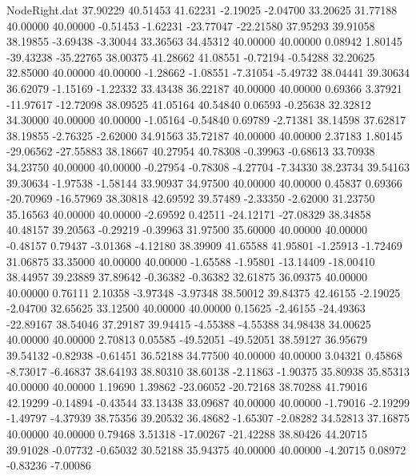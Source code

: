 \begin{filecontents}{NodeRight.dat}
  37.90229   40.51453   41.62231    -2.19025   -2.04700   33.20625   31.77188   40.00000   40.00000   -0.51453   -1.62231  -23.77047  -22.21580
  37.95293   39.91058   38.19855    -3.69438   -3.30044   33.36563   34.45312   40.00000   40.00000    0.08942    1.80145  -39.43238  -35.22765
  38.00375   41.28662   41.08551    -0.72194   -0.54288   32.20625   32.85000   40.00000   40.00000   -1.28662   -1.08551   -7.31054   -5.49732
  38.04441   39.30634   36.62079    -1.15169   -1.22332   33.43438   36.22187   40.00000   40.00000    0.69366    3.37921  -11.97617  -12.72098
  38.09525   41.05164   40.54840     0.06593   -0.25638   32.32812   34.30000   40.00000   40.00000   -1.05164   -0.54840    0.69789   -2.71381
  38.14598   37.62817   38.19855    -2.76325   -2.62000   34.91563   35.72187   40.00000   40.00000    2.37183    1.80145  -29.06562  -27.55883
  38.18667   40.27954   40.78308    -0.39963   -0.68613   33.70938   34.23750   40.00000   40.00000   -0.27954   -0.78308   -4.27704   -7.34330
  38.23734   39.54163   39.30634    -1.97538   -1.58144   33.90937   34.97500   40.00000   40.00000    0.45837    0.69366  -20.70969  -16.57969
  38.30818   42.69592   39.57489    -2.33350   -2.62000   31.23750   35.16563   40.00000   40.00000   -2.69592    0.42511  -24.12171  -27.08329
  38.34858   40.48157   39.20563    -0.29219   -0.39963   31.97500   35.60000   40.00000   40.00000   -0.48157    0.79437   -3.01368   -4.12180
  38.39909   41.65588   41.95801    -1.25913   -1.72469   31.06875   33.35000   40.00000   40.00000   -1.65588   -1.95801  -13.14409  -18.00410
  38.44957   39.23889   37.89642    -0.36382   -0.36382   32.61875   36.09375   40.00000   40.00000    0.76111    2.10358   -3.97348   -3.97348
  38.50012   39.84375   42.46155    -2.19025   -2.04700   32.65625   33.12500   40.00000   40.00000    0.15625   -2.46155  -24.49363  -22.89167
  38.54046   37.29187   39.94415    -4.55388   -4.55388   34.98438   34.00625   40.00000   40.00000    2.70813    0.05585  -49.52051  -49.52051
  38.59127   36.95679   39.54132    -0.82938   -0.61451   36.52188   34.77500   40.00000   40.00000    3.04321    0.45868   -8.73017   -6.46837
  38.64193   38.80310   38.60138    -2.11863   -1.90375   35.80938   35.85313   40.00000   40.00000    1.19690    1.39862  -23.06052  -20.72168
  38.70288   41.79016   42.19299    -0.14894   -0.43544   33.13438   33.09687   40.00000   40.00000   -1.79016   -2.19299   -1.49797   -4.37939
  38.75356   39.20532   36.48682    -1.65307   -2.08282   34.52813   37.16875   40.00000   40.00000    0.79468    3.51318  -17.00267  -21.42288
  38.80426   44.20715   39.91028    -0.07732   -0.65032   30.52188   35.94375   40.00000   40.00000   -4.20715    0.08972   -0.83236   -7.00086

\end{filecontents}
